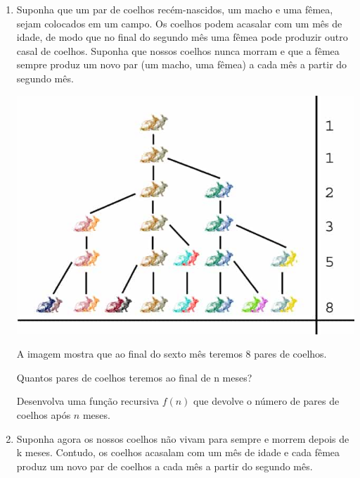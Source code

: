 \begin{enumerate}
\item 



Suponha que um par de coelhos recém-nascidos, um macho e uma fêmea, sejam colocados em um campo. Os coelhos podem acasalar com um mês de idade, de modo que no final do segundo mês uma fêmea pode produzir outro casal de coelhos. Suponha que nossos coelhos nunca morram e que a fêmea sempre produz um novo par (um macho, uma fêmea) a cada mês a partir do segundo mês.  

\begin{center}
\includegraphics[scale=0.4]{images/rabbits.jpg} 
\end{center}

A imagem mostra que ao final do sexto mês teremos 8 pares de coelhos.


Quantos pares de coelhos teremos ao final de n meses?

Desenvolva uma função recursiva $f(n)$ que devolve o número de pares de coelhos após $n$ meses.

\item 




Suponha agora os nossos coelhos não vivam para sempre e morrem depois de k meses. Contudo, os coelhos acasalam com um mês de idade e cada fêmea produz um novo par de coelhos a cada mês a partir do segundo mês.



\end{enumerate}
